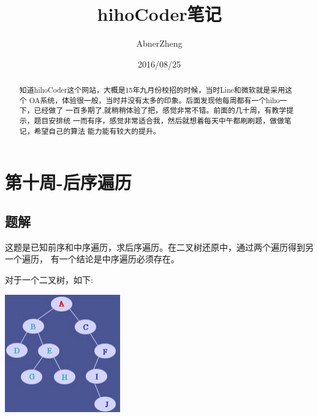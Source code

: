 \documentclass[utf-8]{ctexart}
\begin{document}
\title{hihoCoder笔记}
\author{AbnerZheng}
\date{2016/08/25}
\maketitle{}
\begin{abstract}
  知道hihoCoder这个网站，大概是15年九月份校招的时候，当时Line和微软就是采用这个
  OA系统，体验很一般，当时并没有太多的印象。后面发现他每周都有一个hiho一下，已经做了
  一百多期了,就稍稍体验了把，感觉非常不错。前面的几十周，有教学提示，题目安排统
  一而有序，感觉非常适合我，然后就想着每天中午都刷刷题，做做笔记，希望自己的算法
  能力能有较大的提升。
\end{abstract}

\section{第十周-后序遍历}
\label{sec:week_10}

\subsection{题解}
\label{sec:week_10_ana}

这题是已知前序和中序遍历，求后序遍历。在二叉树还原中，通过两个遍历得到另一个遍历，
有一个结论是中序遍历必须存在。

对于一个二叉树，如下:

\vspace{\doublerulesep}

\begin{center}
\includegraphics[width=.5\textwidth]{../images/note/binary_tree.jpg}
\end{center}
\end{document}
